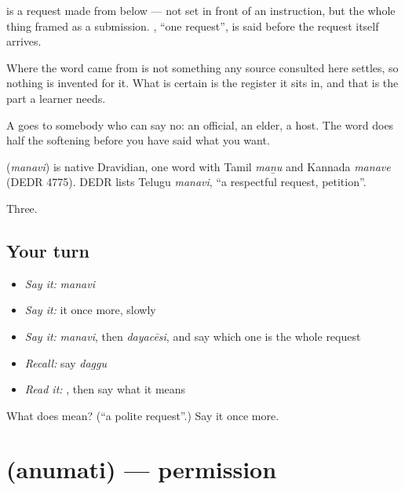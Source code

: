  is a request made from below — not  set in front of an instruction, but the whole thing framed as a submission.  , \textquotedblleft{}one request\textquotedblright{}, is said before the request itself arrives.

Where the word came from is not something any source consulted here settles, so nothing is invented for it. What is certain is the register it sits in, and that is the part a learner needs.

A  goes to somebody who can say no: an official, an elder, a host. The word does half the softening before you have said what you want.

\begin{cousinweb}
\textbf{} (\emph{manavi}) is native Dravidian, one word with Tamil \emph{maṉu} and Kannada \emph{manave} (DEDR 4775). DEDR lists Telugu \emph{manavi}, \textquotedblleft{}a respectful request, petition\textquotedblright{}.
\end{cousinweb}

\begin{grammarlens}[title={What you've built}]
Three.
\end{grammarlens}

\subsection*{Your turn}
\begin{itemize}
\raggedright
  \item \emph{Say it:} \emph{manavi}
  \item \emph{Say it:} it once more, slowly
  \item \emph{Say it:} \emph{manavi}, then \emph{dayacēsi}, and say which one is the whole request
  \item \emph{Recall:} say \emph{daggu}
  \item \emph{Read it:} \textbf{}, then say what it means
\end{itemize}

\begin{tcolorbox}[breakable,colback=teal!4,colframe=teal!35!black,title={Before you move on}]
What does  mean? (\textquotedblleft{}a polite request\textquotedblright{}.) Say it once more.
\end{tcolorbox}
\section[\texorpdfstring{\te{అనుమతి} (anumati)}{అనుమతి (anumati)}]{ (anumati) — permission}

